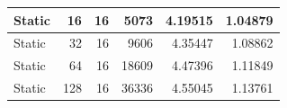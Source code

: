 \documentclass[journal,transmag]{IEEEtran}
\begin{document}
\begin{table}[h!]
\begin{tabular}{|l|r|r|r|r|r|}
		Static        & 16                           & 16                           & 5073                              & 4.19515                       & 1.04879                         \\ \hline
		Static        & 32                           & 16                           & 9606                              & 4.35447                       & 1.08862                         \\ \hline
		Static        & 64                           & 16                           & 18609                             & 4.47396                       & 1.11849                         \\ \hline
		Static        & 128                          & 16                           & 36336                             & 4.55045                       & 1.13761                         \\ \hline
	\end{tabular}
\end{table}
	\newpage
	
\end{document}
